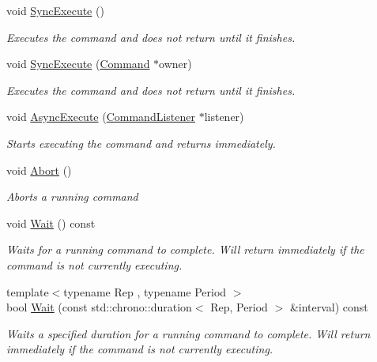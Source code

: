 \begin{DoxyCompactItemize}
void \mbox{\hyperlink{class_command_lib_1_1_command_a5d33760ccb927d7f6349c02907ab4ff3}{Sync\+Execute}} ()
\begin{DoxyCompactList}\small\item\em Executes the command and does not return until it finishes.\end{DoxyCompactList}\item 
void \mbox{\hyperlink{class_command_lib_1_1_command_a663d50889f527a4963eebd88bbcdc522}{Sync\+Execute}} (\mbox{\hyperlink{class_command_lib_1_1_command}{Command}} $\ast$owner)
\begin{DoxyCompactList}\small\item\em Executes the command and does not return until it finishes.\end{DoxyCompactList}\item 
void \mbox{\hyperlink{class_command_lib_1_1_command_a44bad231a0f0a6de3d5405382d95f800}{Async\+Execute}} (\mbox{\hyperlink{class_command_lib_1_1_command_listener}{Command\+Listener}} $\ast$listener)
\begin{DoxyCompactList}\small\item\em Starts executing the command and returns immediately. \end{DoxyCompactList}\item 
void \mbox{\hyperlink{class_command_lib_1_1_command_a247cbc7325e3b9d9d7044d449b989aa6}{Abort}} ()
\begin{DoxyCompactList}\small\item\em Aborts a running command\end{DoxyCompactList}\item 
void \mbox{\hyperlink{class_command_lib_1_1_command_ac4d49fbf9bbcc543fb57e4b04edf1ddb}{Wait}} () const
\begin{DoxyCompactList}\small\item\em Waits for a running command to complete. Will return immediately if the command is not currently executing. \end{DoxyCompactList}\item 
{\footnotesize template$<$typename Rep , typename Period $>$ }\\bool \mbox{\hyperlink{class_command_lib_1_1_command_a0cd3c0e7ee280652c69a3e13a30b99e7}{Wait}} (const std\+::chrono\+::duration$<$ Rep, Period $>$ \&interval) const
\begin{DoxyCompactList}\small\item\em Waits a specified duration for a running command to complete. Will return immediately if the command is not currently executing. \end{DoxyCompactList}\item 

\end{DoxyCompactItemize}
